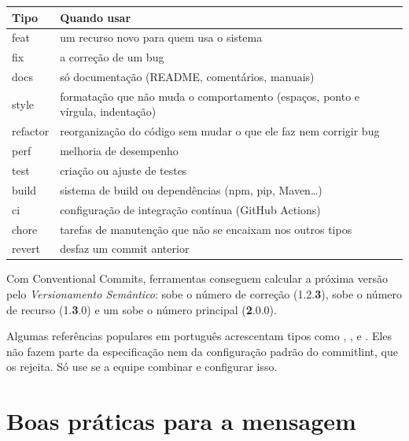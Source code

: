 \begin{center}
\renewcommand{\arraystretch}{1.3}
\begin{tabularx}{\linewidth}{@{}>{\ttfamily\color{roxoescuro}}l X@{}}
\toprule
\textrm{\textbf{Tipo}} & \textbf{Quando usar} \\
\midrule
feat & um recurso novo para quem usa o sistema \\
fix & a correção de um bug \\
docs & só documentação (README, comentários, manuais) \\
style & formatação que não muda o comportamento (espaços, ponto e vírgula, indentação) \\
refactor & reorganização do código sem mudar o que ele faz nem corrigir bug \\
perf & melhoria de desempenho \\
test & criação ou ajuste de testes \\
build & sistema de build ou dependências (npm, pip, Maven\ldots) \\
ci & configuração de integração contínua (GitHub Actions) \\
chore & tarefas de manutenção que não se encaixam nos outros tipos \\
revert & desfaz um commit anterior \\
\bottomrule
\end{tabularx}
\end{center}

\begin{dica}
Com Conventional Commits, ferramentas conseguem calcular a próxima versão pelo \emph{Versionamento Semântico}:  sobe o número de correção (1.2.\textbf{3}),  sobe o número de recurso (1.\textbf{3}.0) e um  sobe o número principal (\textbf{2}.0.0).
\end{dica}

\begin{aviso}
Algumas referências populares em português acrescentam tipos como , ,  e . Eles não fazem parte da especificação nem da configuração padrão do commitlint, que os rejeita. Só use se a equipe combinar e configurar isso.
\end{aviso}

\section{Boas práticas para a mensagem}

